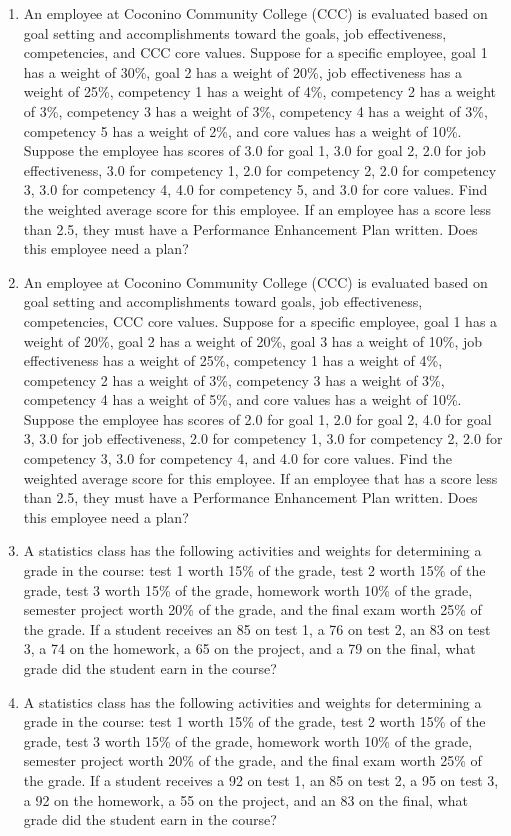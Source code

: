 \documentclass[
]{book}
\begin{document}
\begin{enumerate}
\def\labelenumi{\arabic{enumi}.}
\setcounter{enumi}{6}
\item
  An employee at Coconino Community College (CCC) is evaluated based on goal setting and accomplishments toward the goals, job effectiveness, competencies, and CCC core values. Suppose for a specific employee, goal 1 has a weight of 30\%, goal 2 has a weight of 20\%, job effectiveness has a weight of 25\%, competency 1 has a weight of 4\%, competency 2 has a weight of 3\%, competency 3 has a weight of 3\%, competency 4 has a weight of 3\%, competency 5 has a weight of 2\%, and core values has a weight of 10\%. Suppose the employee has scores of 3.0 for goal 1, 3.0 for goal 2, 2.0 for job effectiveness, 3.0 for competency 1, 2.0 for competency 2, 2.0 for competency 3, 3.0 for competency 4, 4.0 for competency 5, and 3.0 for core values. Find the weighted average score for this employee. If an employee has a score less than 2.5, they must have a Performance Enhancement Plan written. Does this employee need a plan?
\item
  An employee at Coconino Community College (CCC) is evaluated based on goal setting and accomplishments toward goals, job effectiveness, competencies, CCC core values. Suppose for a specific employee, goal 1 has a weight of 20\%, goal 2 has a weight of 20\%, goal 3 has a weight of 10\%, job effectiveness has a weight of 25\%, competency 1 has a weight of 4\%, competency 2 has a weight of 3\%, competency 3 has a weight of 3\%, competency 4 has a weight of 5\%, and core values has a weight of 10\%. Suppose the employee has scores of 2.0 for goal 1, 2.0 for goal 2, 4.0 for goal 3, 3.0 for job effectiveness, 2.0 for competency 1, 3.0 for competency 2, 2.0 for competency 3, 3.0 for competency 4, and 4.0 for core values. Find the weighted average score for this employee. If an employee that has a score less than 2.5, they must have a Performance Enhancement Plan written. Does this employee need a plan?
\item
  A statistics class has the following activities and weights for determining a grade in the course: test 1 worth 15\% of the grade, test 2 worth 15\% of the grade, test 3 worth 15\% of the grade, homework worth 10\% of the grade, semester project worth 20\% of the grade, and the final exam worth 25\% of the grade. If a student receives an 85 on test 1, a 76 on test 2, an 83 on test 3, a 74 on the homework, a 65 on the project, and a 79 on the final, what grade did the student earn in the course?
\item
  A statistics class has the following activities and weights for determining a grade in the course: test 1 worth 15\% of the grade, test 2 worth 15\% of the grade, test 3 worth 15\% of the grade, homework worth 10\% of the grade, semester project worth 20\% of the grade, and the final exam worth 25\% of the grade. If a student receives a 92 on test 1, an 85 on test 2, a 95 on test 3, a 92 on the homework, a 55 on the project, and an 83 on the final, what grade did the student earn in the course?
\end{enumerate}
\end{document}
